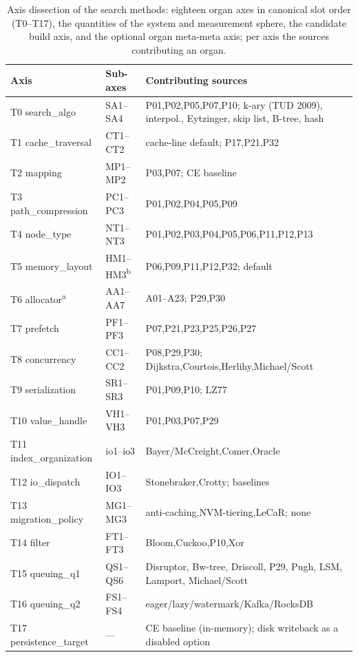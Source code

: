 \begin{nurkurz}
\begin{table}[!htbp]
  \caption{Axis dissection of the search methods: eighteen organ axes in canonical
  slot order (T0--T17), the quantities of the system and measurement sphere, the
  candidate build axis, and the optional organ meta-meta axis; per axis the sources contributing an organ.}\label{tab:axes-overview}
  \centering\footnotesize
  \begin{tabular}{@{}l l p{6.8cm}@{}}
    \toprule
    \textbf{Axis} & \textbf{Sub-axes} & \textbf{Contributing sources} \\
    \midrule
    T0 search\_algo & SA1--SA4 & P01,P02,P05,P07,P10; k-ary (TUD 2009), interpol., Eytzinger, skip list, B-tree, hash \\
    T1 cache\_traversal & CT1--CT2 & cache-line default; P17,P21,P32 \\
    T2 mapping & MP1--MP2 & P03,P07; CE baseline \\
    T3 path\_compression & PC1--PC3 & P01,P02,P04,P05,P09 \\
    T4 node\_type & NT1--NT3 & P01,P02,P03,P04,P05,P06,P11,P12,P13 \\
    T5 memory\_layout & HM1--HM3\textsuperscript{b} & P06,P09,P11,P12,P32; default \\
    T6 allocator\textsuperscript{a} & AA1--AA7 & A01--A23; P29,P30 \\
    T7 prefetch & PF1--PF3 & P07,P21,P23,P25,P26,P27 \\
    T8 concurrency & CC1--CC2 & P08,P29,P30; Dijkstra,Courtois,Herlihy,Michael/Scott \\
    T9 serialization & SR1--SR3 & P01,P09,P10; LZ77 \\
    \midrule
    T10 value\_handle & VH1--VH3 & P01,P03,P07,P29 \\
    T11 index\_organization & io1--io3 & Bayer/McCreight,Comer,Oracle \\
    T12 io\_dispatch & IO1--IO3 & Stonebraker,Crotty; baselines \\
    T13 migration\_policy & MG1--MG3 & anti-caching,NVM-tiering,LeCaR\@; none \\
    T14 filter & FT1--FT3 & Bloom,Cuckoo,P10,Xor \\
    T15 queuing\_q1 & QS1--QS6 & Disruptor, Bw-tree, Driscoll, P29, Pugh, LSM, Lamport, Michael/Scott \\
    T16 queuing\_q2 & FS1--FS4 & eager/lazy/watermark/Kafka/RocksDB \\
    T17 persistence\_target & --- & CE baseline (in-memory); disk writeback as a disabled option \\

\end{tabular}
\end{table}
\end{nurkurz}
